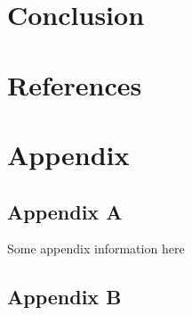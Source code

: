 \documentclass[11pt,preprint, authoryear]{elsarticle}
\numberwithin{equation}{section}
\numberwithin{figure}{section}
\numberwithin{table}{section}
\newlength{\cslhangindent}
\newenvironment{CSLReferences}%
  {\setlength{\parindent}{0pt}%
  \everypar{\setlength{\hangindent}{\cslhangindent}}\ignorespaces}%
  {\par}
\begin{document}
\hypertarget{conclusion}{%
\section{Conclusion}\label{conclusion}}

\newpage

\hypertarget{references}{%
\section*{References}\label{references}}

\hypertarget{refs}{}
\begin{CSLReferences}{0}{0}
\end{CSLReferences}

\hypertarget{appendix}{%
\section*{Appendix}\label{appendix}}

\hypertarget{appendix-a}{%
\subsection*{Appendix A}\label{appendix-a}}

Some appendix information here

\hypertarget{appendix-b}{%
\subsection*{Appendix B}\label{appendix-b}}


\end{document}
